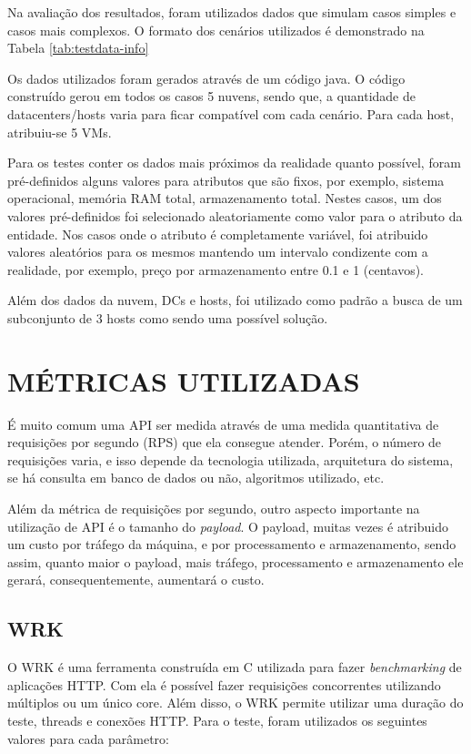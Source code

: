 Na avaliação dos resultados, foram utilizados dados que simulam casos simples e casos mais 
complexos. O formato dos cenários utilizados é demonstrado na Tabela \ref{tab:testdata-info}



Os dados utilizados foram gerados através de um código java. O código
construído gerou em todos os casos 5 nuvens, sendo que, a quantidade de
datacenters/hosts varia para ficar compatível com cada cenário. Para cada
host, atribuiu-se 5 VMs.

Para os testes conter os dados mais próximos da realidade quanto possível,
foram pré-definidos alguns valores para atributos que são fixos, por exemplo,
sistema operacional, memória RAM total, armazenamento total. Nestes casos, um dos valores
pré-definidos foi selecionado aleatoriamente como valor para o atributo da entidade. 
Nos casos onde o atributo é completamente variável, foi atribuido valores aleatórios para os 
mesmos mantendo um intervalo condizente com a realidade, por exemplo, preço por armazenamento
entre 0.1 e 1 (centavos).

Além dos dados da nuvem, DCs e hosts, foi utilizado como padrão a busca de um subconjunto de
3 hosts como sendo uma possível solução. 

\section{MÉTRICAS UTILIZADAS}
É muito comum uma API ser medida através de uma medida quantitativa de requisições 
por segundo (RPS) que ela consegue atender. Porém, o número de requisições 
varia, e isso depende da tecnologia utilizada, arquitetura do sistema, se há 
consulta em banco de dados ou não, algoritmos utilizado, etc.

Além da métrica de requisições por segundo, outro aspecto importante na utilização de API
é o tamanho do \textit{payload}. O payload, muitas vezes é atribuido um custo por 
tráfego da máquina, e por processamento e armazenamento, sendo assim, quanto maior
o payload, mais tráfego, processamento e armazenamento ele gerará, consequentemente,
aumentará o custo. 

\subsection{WRK}

O WRK é uma ferramenta construída em C utilizada para fazer \textit{benchmarking} de 
aplicações HTTP. Com ela é possível fazer requisições concorrentes utilizando 
múltiplos ou um único core. Além disso, o WRK permite utilizar uma duração
do teste, threads e conexões HTTP. Para o teste, foram utilizados os seguintes 
valores para cada parâmetro:

